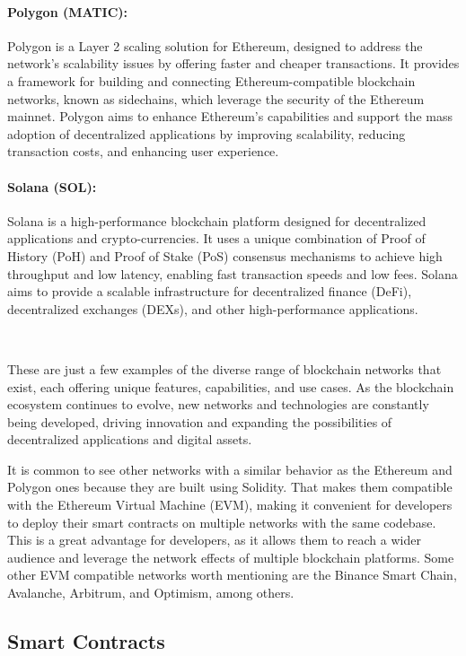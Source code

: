 \paragraph{Polygon (MATIC):}
Polygon is a Layer 2 scaling solution for Ethereum, designed to address the
network's scalability issues by offering faster and cheaper transactions. It
provides a framework for building and connecting Ethereum-compatible blockchain
networks, known as sidechains, which leverage the security of the Ethereum
mainnet. Polygon aims to enhance Ethereum's capabilities and support the mass
adoption of decentralized applications by improving scalability, reducing
transaction costs, and enhancing user experience.

\paragraph{Solana (SOL):}
Solana is a high-performance blockchain platform designed for decentralized
applications and crypto-currencies. It uses a unique combination of Proof of
History (PoH) and Proof of Stake (PoS) consensus mechanisms to achieve high
throughput and low latency, enabling fast transaction speeds and low fees.
Solana aims to provide a scalable infrastructure for decentralized finance
(DeFi), decentralized exchanges (DEXs), and other high-performance
applications.

~

These are just a few examples of the diverse range of blockchain networks that
exist, each offering unique features, capabilities, and use cases. As the
blockchain ecosystem continues to evolve, new networks and technologies are
constantly being developed, driving innovation and expanding the possibilities
of decentralized applications and digital assets.

It is common to see other networks with a similar behavior as the Ethereum and
Polygon ones because they are built using Solidity. That makes them compatible
with the Ethereum Virtual Machine (EVM), making it convenient for developers to
deploy their smart contracts on multiple networks with the same codebase. This
is a great advantage for developers, as it allows them to reach a wider
audience and leverage the network effects of multiple blockchain platforms.
Some other EVM compatible networks worth mentioning are the Binance Smart
Chain, Avalanche, Arbitrum, and Optimism, among others.

\subsection{Smart Contracts}
\label{subsec:smart_contracts}

